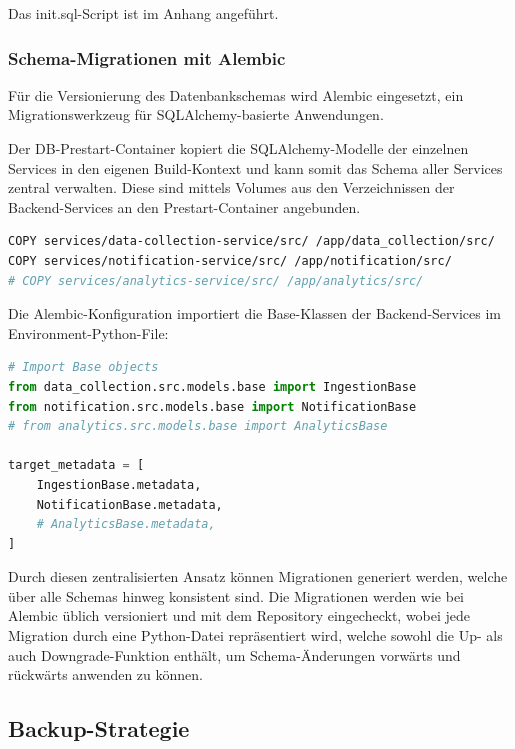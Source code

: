 Das init.sql-Script ist im Anhang angeführt.


\subsubsection{Schema-Migrationen mit Alembic}

Für die Versionierung des Datenbankschemas wird Alembic eingesetzt, ein Migrationswerkzeug für SQLAlchemy-basierte Anwendungen.

Der DB-Prestart-Container kopiert die SQLAlchemy-Modelle der einzelnen Services in den eigenen Build-Kontext und kann somit das Schema aller Services zentral verwalten. \cite{alembic_monorepo}
Diese sind mittels Volumes aus den Verzeichnissen der Backend-Services an den Prestart-Container angebunden.

\begin{lstlisting}[language=bash, caption={Dockerfile COPY Anweisungen}, label={lst:prestart_copy}]
COPY services/data-collection-service/src/ /app/data_collection/src/
COPY services/notification-service/src/ /app/notification/src/
# COPY services/analytics-service/src/ /app/analytics/src/
\end{lstlisting}

\newpage
Die Alembic-Konfiguration importiert die Base-Klassen der Backend-Services im Environment-Python-File:

\begin{lstlisting}[language=python, caption={Alembic target\_metadata}, label={lst:alembic_env}]
# Import Base objects
from data_collection.src.models.base import IngestionBase
from notification.src.models.base import NotificationBase
# from analytics.src.models.base import AnalyticsBase

target_metadata = [
    IngestionBase.metadata,
    NotificationBase.metadata,
    # AnalyticsBase.metadata,
]
\end{lstlisting}

Durch diesen zentralisierten Ansatz können Migrationen generiert werden, welche über alle Schemas hinweg konsistent sind.
Die Migrationen werden wie bei Alembic üblich versioniert und mit dem Repository eingecheckt, wobei jede Migration durch eine Python-Datei repräsentiert wird, welche sowohl die Up- als auch Downgrade-Funktion enthält, um Schema-Änderungen vorwärts und rückwärts anwenden zu können.

\newpage
\subsection{Backup-Strategie}

